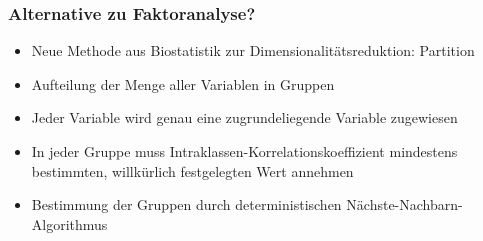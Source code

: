 \begin{frame}[fragile]
\frametitle{Alternative zu Faktoranalyse?}
\begin{itemize}
\item<1-> Neue Methode aus Biostatistik zur Dimensionalitätsreduktion: Partition \parencite{Millstein.2020}
\item<2-> Aufteilung der Menge aller Variablen in Gruppen
\item<3-> Jeder Variable wird genau eine zugrundeliegende Variable zugewiesen
\item<3-> In jeder Gruppe muss Intraklassen-Korrelationskoeffizient mindestens bestimmten, willkürlich festgelegten Wert annehmen
\item<4-> Bestimmung der Gruppen durch deterministischen Nächste-Nachbarn-Algorithmus

\end{itemize}
\end{frame}

